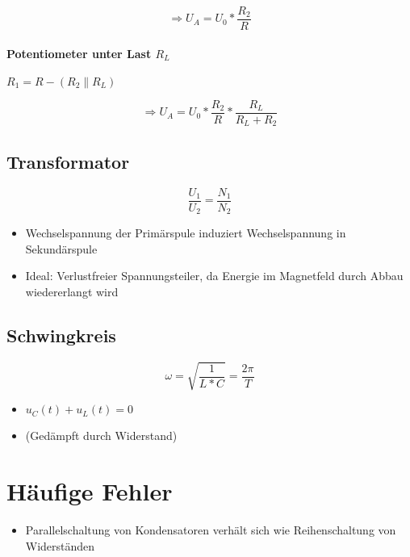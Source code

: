$$\Rightarrow U_A = U_0 * \frac{R_2}{R}$$

\paragraph{Potentiometer unter Last $R_L$}
$R_1 = R - (R_2 \parallel R_L)$

$$\Rightarrow U_A = U_0 * \frac{R_2}{R} * \frac{R_L}{R_L + R_2}$$

\subsection{Transformator}

$$\frac{U_1}{U_2} = \frac{N_1}{N_2}$$

\begin{itemize}
  \item Wechselspannung der Primärspule induziert Wechselspannung in Sekundärspule
  \item Ideal: Verlustfreier Spannungsteiler, da Energie im Magnetfeld durch Abbau wiedererlangt wird
\end{itemize}

\subsection{Schwingkreis}

$$\omega = \sqrt{\frac{1}{L * C}} = \frac{2\pi}{T}$$

\begin{itemize}
  \item $u_C(t) + u_L(t) = 0$
  \item (Gedämpft durch Widerstand)
\end{itemize}

\section{Häufige Fehler}

\begin{itemize}
  \item Parallelschaltung von Kondensatoren verhält sich wie Reihenschaltung von Widerständen
\end{itemize}